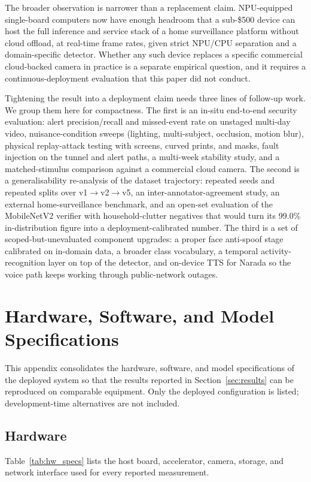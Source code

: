 \documentclass{ieeeaccess}
\begin{document}
The broader observation is narrower than a replacement claim. NPU-equipped single-board computers now have enough headroom that a sub-\$500 device can host the full inference and service stack of a home surveillance platform without cloud offload, at real-time frame rates, given strict NPU/CPU separation and a domain-specific detector. Whether any such device replaces a specific commercial cloud-backed camera in practice is a separate empirical question, and it requires a continuous-deployment evaluation that this paper did not conduct.

Tightening the result into a deployment claim needs three lines of follow-up work. We group them here for compactness. The first is an in-situ end-to-end security evaluation: alert precision/recall and missed-event rate on unstaged multi-day video, nuisance-condition sweeps (lighting, multi-subject, occlusion, motion blur), physical replay-attack testing with screens, curved prints, and masks, fault injection on the tunnel and alert paths, a multi-week stability study, and a matched-stimulus comparison against a commercial cloud camera. The second is a generalisability re-analysis of the dataset trajectory: repeated seeds and repeated splits over v1$\rightarrow$v2$\rightarrow$v5, an inter-annotator-agreement study, an external home-surveillance benchmark, and an open-set evaluation of the MobileNetV2 verifier with household-clutter negatives that would turn its 99.0\% in-distribution figure into a deployment-calibrated number. The third is a set of scoped-but-unevaluated component upgrades: a proper face anti-spoof stage calibrated on in-domain data, a broader class vocabulary, a temporal activity-recognition layer on top of the detector, and on-device TTS for Narada so the voice path keeps working through public-network outages.



\appendices
\section{Hardware, Software, and Model Specifications}
\label{sec:specs}
This appendix consolidates the hardware, software, and model specifications of the deployed system so that the results reported in Section~\ref{sec:results} can be reproduced on comparable equipment. Only the deployed configuration is listed; development-time alternatives are not included.

\subsection{Hardware}
Table~\ref{tab:hw_specs} lists the host board, accelerator, camera, storage, and network interface used for every reported measurement.
\end{document}
